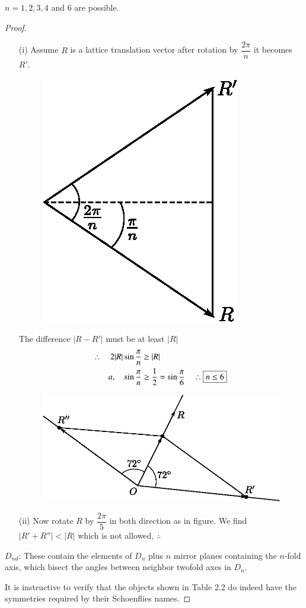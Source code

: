 $n=1,2,3,4$ and $6$ are possible.

\begin{proof}
\begin{itemize}
\item[(i)] Assume $R$ is a lattice translation vector after rotation by $\dfrac{2\pi}{n}$ it becomes $R'$.
\begin{figure}[H]
\centering
\includegraphics[scale=.9]{images/lecture10/fig4.eps}
\end{figure}
The difference $|R-R'|$ must be at least $|R|$
\begin{align*}
\therefore\quad 2|R|\sin \dfrac{\pi}{n} &\geq |R|\\
a,\quad \sin \dfrac{\pi}{n} &\geq \dfrac{1}{2}=\sin \dfrac{\pi}{6}\quad \therefore \fbox{$n\leq 6$}
\end{align*}
\begin{figure}[H]
\centering
\includegraphics[scale=.9]{images/lecture10/fig5.eps}
\end{figure}

\item[(ii)] Now rotate $R$ by $\dfrac{2\pi}{5}$ in both direction as in figure. We find $|R'+R''|<|R|$ which is not allowed, $\therefore$ \ 
\end{itemize}

$D_{nd}$: These contain the elements of $D_{n}$ plus $n$ mirror planes containing the $n$-fold axis, which bisect the angles between neighbor twofold axes in $D_{n}$.

It is instructive to verify that the objects shown in Table 2.2 do indeed have the symmetries required by their Schoenflies names.
\end{proof}


